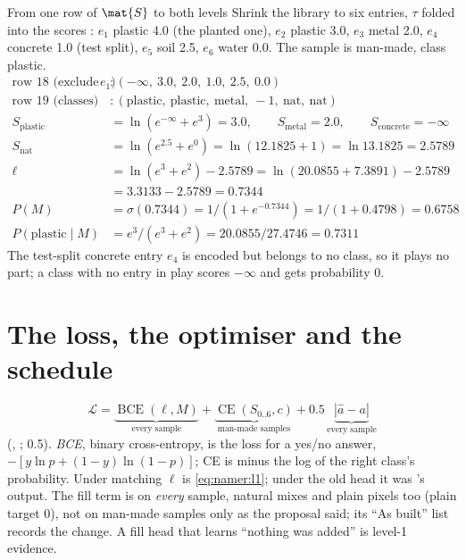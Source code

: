\begin{worked}[label={we:namer:pool}]{From one row of $\mat{S}$ to both levels}
Shrink the library to six entries, $\tau$ folded into the scores \tagA: $e_1$ plastic 4.0 (the planted one), $e_2$
plastic 3.0, $e_3$ metal 2.0, $e_4$ concrete 1.0 (test split), $e_5$ soil 2.5, $e_6$ water 0.0. The sample is man-made,
class plastic.
\begin{align*}
\text{row 18 (exclude }e_1) &: (-\infty,\ 3.0,\ 2.0,\ 1.0,\ 2.5,\ 0.0)\\
\text{row 19 (classes)} &: (\text{plastic},\ \text{plastic},\ \text{metal},\ -1,\ \text{nat},\ \text{nat})\\
S_{\text{plastic}} &= \ln(e^{-\infty}+e^{3}) = 3.0,\qquad S_{\text{metal}}=2.0,\qquad S_{\text{concrete}}=-\infty\\
S_{\text{nat}} &= \ln(e^{2.5}+e^{0}) = \ln(12.1825+1) = \ln13.1825 = 2.5789\\
\ell &= \ln(e^{3}+e^{2})-2.5789 = \ln(20.0855+7.3891)-2.5789\\
&= 3.3133-2.5789 = 0.7344\\
P(M) &= \sigma(0.7344) = 1/(1+e^{-0.7344}) = 1/(1+0.4798) = 0.6758\\
P(\text{plastic}\mid M) &= e^{3}/(e^{3}+e^{2}) = 20.0855/27.4746 = 0.7311
\end{align*}
The test-split concrete entry $e_4$ is encoded but belongs to no class, so it plays no part; a class with no entry in
play scores $-\infty$ and gets probability 0.
\end{worked}

\section{The loss, the optimiser and the schedule}\label{sec:namer:loss}

\begin{equation}
\mathcal{L}=\underbrace{\operatorname{BCE}(\ell,M)}_{\text{every sample}}
+\underbrace{\operatorname{CE}(S_{0..6},c)}_{\text{man-made samples}}
+0.5\,\underbrace{|\hat a-a|}_{\text{every sample}}
\label{eq:namer:loss}
\end{equation}
(, ;  0.5). \emph{BCE}, binary cross-entropy, is the loss for a
yes/no answer, $-[y\ln p+(1-y)\ln(1-p)]$; CE is minus the log of the right class's probability. Under matching $\ell$ is
\cref{eq:namer:l1}; under the old head it was 's output. The fill term is on \emph{every} sample,
natural mixes and plain pixels too (plain target 0), not on man-made samples only as the proposal said; its ``As built''
list records the change. A fill head that learns ``nothing was added'' is level-1 evidence.

